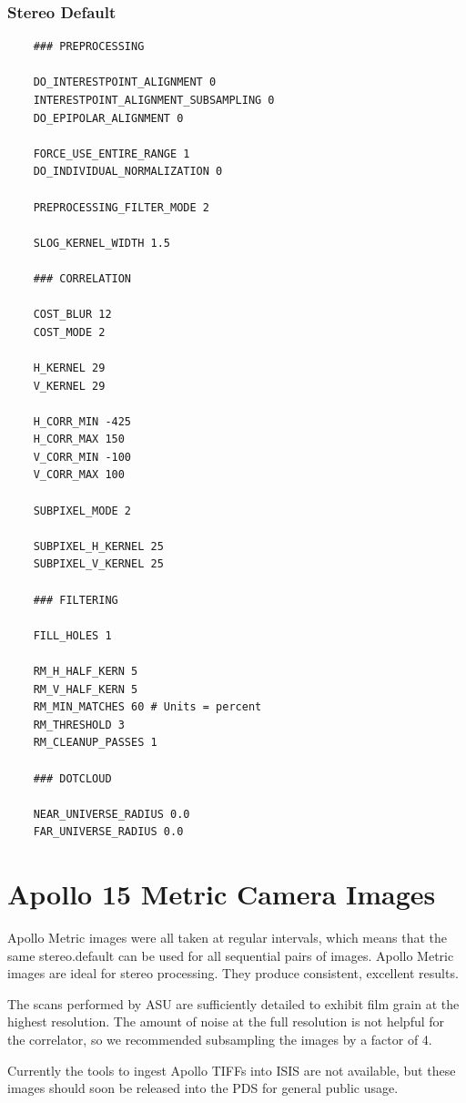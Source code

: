 \subsubsection*{Stereo Default}

\begin{verbatim}
    ### PREPROCESSING

    DO_INTERESTPOINT_ALIGNMENT 0
    INTERESTPOINT_ALIGNMENT_SUBSAMPLING 0
    DO_EPIPOLAR_ALIGNMENT 0

    FORCE_USE_ENTIRE_RANGE 1
    DO_INDIVIDUAL_NORMALIZATION 0

    PREPROCESSING_FILTER_MODE 2

    SLOG_KERNEL_WIDTH 1.5

    ### CORRELATION

    COST_BLUR 12
    COST_MODE 2

    H_KERNEL 29
    V_KERNEL 29

    H_CORR_MIN -425
    H_CORR_MAX 150
    V_CORR_MIN -100
    V_CORR_MAX 100

    SUBPIXEL_MODE 2

    SUBPIXEL_H_KERNEL 25
    SUBPIXEL_V_KERNEL 25

    ### FILTERING

    FILL_HOLES 1

    RM_H_HALF_KERN 5
    RM_V_HALF_KERN 5
    RM_MIN_MATCHES 60 # Units = percent
    RM_THRESHOLD 3
    RM_CLEANUP_PASSES 1

    ### DOTCLOUD

    NEAR_UNIVERSE_RADIUS 0.0
    FAR_UNIVERSE_RADIUS 0.0
\end{verbatim}


\section{Apollo 15 Metric Camera Images}

Apollo Metric images were all taken at regular intervals, which means
that the same stereo.default can be used for all sequential pairs of
images. Apollo Metric images are ideal for stereo processing.  They
produce consistent, excellent results.

The scans performed by ASU are sufficiently detailed to exhibit film
grain at the highest resolution.  The amount of noise at the full
resolution is not helpful for the correlator, so we recommended
subsampling the images by a factor of 4.

Currently the tools to ingest Apollo TIFFs into ISIS are not
available, but these images should soon be released into the PDS for
general public usage.

